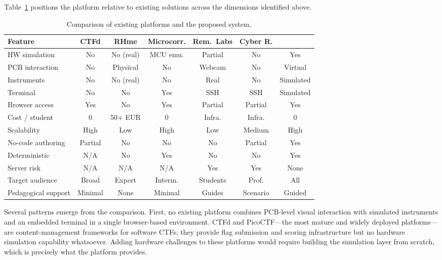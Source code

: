 Table~\ref{tab:comparison-soa} positions the \pcbctf{} platform relative to existing solutions across the dimensions identified above.

\begin{table}[H]
\centering
\caption{Comparison of existing platforms and the proposed \pcbctf{} system.}
\label{tab:comparison-soa}
\footnotesize
\setlength{\tabcolsep}{3pt}
\begin{tabular}{@{}lcccccc@{}}
\toprule
\textbf{Feature} & \textbf{CTFd} & \textbf{RHme} & \textbf{Microcorr.} & \textbf{Rem.\ Labs} & \textbf{Cyber R.} & \textbf{\pcbctf{}} \\
\midrule
HW simulation       & No      & No (real) & MCU emu.    & Partial  & No      & Yes \\
PCB interaction      & No      & Physical  & No          & Webcam   & No      & Virtual \\
Instruments          & No      & No (real) & No          & Real     & No      & Simulated \\
Terminal             & No      & No        & Yes         & SSH      & SSH     & Simulated \\
Browser access       & Yes     & No        & Yes         & Partial  & Partial & Yes \\
Cost / student       & 0       & 50+ EUR   & 0           & Infra.   & Infra.  & 0 \\
Scalability          & High    & Low       & High        & Low      & Medium  & High \\
No-code authoring    & Partial & No        & No          & No       & Partial & Yes \\
Deterministic        & N/A     & No        & Yes         & No       & No      & Yes \\
Server risk          & N/A     & N/A       & N/A         & Yes      & Yes     & None \\
Target audience      & Broad   & Expert    & Interm.     & Students & Prof.   & All \\
Pedagogical support  & Minimal & None      & Minimal     & Guides   & Scenario& Guided \\
\bottomrule
\end{tabular}
\end{table}

Several patterns emerge from the comparison. First, no existing platform combines PCB-level visual interaction with simulated instruments and an embedded terminal in a single browser-based environment. CTFd and PicoCTF---the most mature and widely deployed platforms---are content-management frameworks for software CTFs; they provide flag submission and scoring infrastructure but no hardware simulation capability whatsoever. Adding hardware challenges to these platforms would require building the simulation layer from scratch, which is precisely what the \pcbctf{} platform provides.

